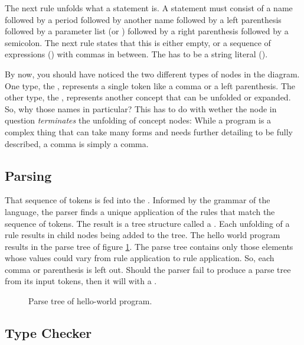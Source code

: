 The next rule unfolds what a statement is. A statement must consist of a name followed by a period followed by another name followed by a left parenthesis followed by a parameter list (or ) followed by a right parenthesis followed by a semicolon. The next rule states that this  is either empty, or a sequence of expressions () with commas in between. The  has to be a string literal ().

By now, you should have noticed the two different types of nodes in the diagram. One type, the , represents a single token like a comma or a left parenthesis. The other type, the , represents another concept that can be unfolded or expanded. So, why those names in particular? This has to do with wether the node in question \textsl{terminates} the unfolding of concept nodes: While a program is a complex thing that can take many forms and needs further detailing to be fully described, a comma is simply a comma.

\subsection{Parsing}

That sequence of tokens is fed into the . Informed by the grammar of the language, the parser finds a unique application of the rules that match the sequence of tokens. The result is a tree structure called a . Each unfolding of a rule results in child nodes being added to the tree. The hello world program results in the parse tree of figure \ref{fig:first:hello:parsetree}. The parse tree contains only those elements whose values could vary from rule application to rule application. So, each comma or parenthesis is left out. Should the parser fail to produce a parse tree from its input tokens, then it will  with a .

\begin{figure}[tbp]
  
  \caption{Parse tree of hello-world program.}
  \label{fig:first:hello:parsetree}
\end{figure}

\subsection{Type Checker}

